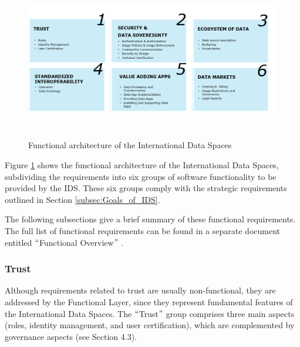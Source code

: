 
\begin{figure}[H]
	\begin{Center}
		\includegraphics[width=6.44in,height=2.78in]{./media/image21.png}
		\caption{ Functional architecture of the International Data Spaces}
		\label{fig:_Functional_architecture_of_the_International_Data_Spaces}
	\end{Center}
\end{figure}




Figure \ref{fig:_Functional_architecture_of_the_International_Data_Spaces} shows the functional architecture of the International Data Spaces, subdividing the requirements into six groups of software functionality to be provided by the IDS. These six groups comply with the strategic requirements outlined in Section \ref{subsec:Goals_of_IDS}.



 The following subsections give a brief summary of these functional requirements. The full list of functional requirements can be found in a separate document entitled $``$Functional Overview$"$ .

\subsubsection{Trust}\label{subsec:functional_layer_trust}

Although requirements related to trust are usually non-functional, they are addressed by the Functional Layer, since they represent fundamental features of the International Data Spaces. The $``$Trust$"$  group comprises three main aspects (roles, identity management, and user certification), which are complemented by governance aspects (see Section 4.3). %

